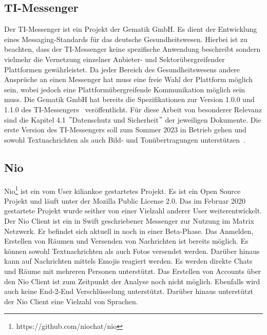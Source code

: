     \subsection{TI-Messenger}\label{subsec:ti-messenger}
    Der TI-Messenger ist ein Projekt der Gematik GmbH.
    Es dient der Entwicklung eines Messaging-Standards für das deutsche Gesundheitswesen.
    Hierbei ist zu beachten, dass der TI-Messenger keine spezifische Anwendung beschreibt sondern vielmehr die Vernetzung einzelner Anbieter- und Sektorübergreifender Plattformen gewährleistet.
    Da jeder Bereich des Gesundheitswesens andere Ansprüche an einen Messenger hat muss eine freie Wahl der Plattform möglich sein, wobei jedoch eine Plattformübergreifende Kommunikation möglich sein muss.
    Die Gematik GmbH hat bereits die Spezifikationen zur Version 1.0.0 und 1.1.0 des TI-Messengers~\cite{timessenger3} veröffentlicht.
    Für diese Arbeit von besonderer Relevanz sind die Kapitel 4.1 \("\)Datenschutz und Sicherheit\("\) der jeweiligen Dokumente.
    Die erste Version des TI-Messengers soll zum Sommer 2023 in Betrieb gehen und sowohl Textnachrichten als auch Bild- und Tonübertragungen unterstützen~\cite{timessenger,timessenger2}.

    \subsection{Nio}
    Nio\footnote{https://github.com/niochat/nio} ist ein vom User kiliankoe gestartetes Projekt.
    Es ist ein Open Source Projekt und läuft unter der Mozilla Public License 2.0.
    Das im Februar 2020 gestartete Projekt wurde seither von einer Vielzahl anderer User weiterentwickelt.
    Der Nio Client ist ein in Swift geschriebener Messenger zur Nutzung im Matrix Netzwerk.
    Er befindet sich aktuell in noch in einer Beta-Phase.
    Das Anmelden, Erstellen von Räumen und Versenden von Nachrichten ist bereits möglich.
    Es können sowohl Textnachrichten als auch Fotos versendet werden.
    Darüber hinaus kann auf Nachrichten mittels Emojis reagiert werden.
    Es werden direkte Chats und Räume mit mehreren Personen unterstützt.
    Das Erstellen von Accounts über den Nio Client ist zum Zeitpunkt der Analyse noch nicht möglich.
    Ebenfalls wird auch keine End-2-End Verschlüsselung unterstützt.
    Darüber hinaus unterstützt der Nio Client eine Vielzahl von Sprachen.

    \newpage
